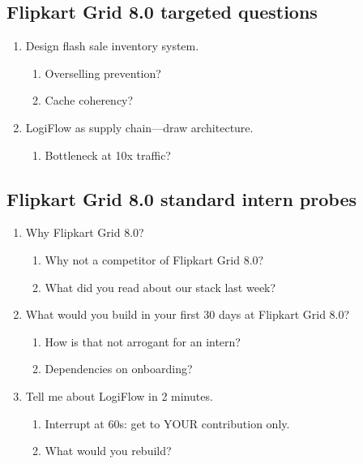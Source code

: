 \documentclass[9pt,a4paper]{article}
\begin{document}
\subsection{Flipkart Grid 8.0 targeted questions}
\begin{enumerate}[label=\textbf{Q\arabic*:}, leftmargin=*]
  \item Design flash sale inventory system.
  \begin{enumerate}[label=\textit{FU\arabic*:}, leftmargin=2em]
    \item Overselling prevention?
    \item Cache coherency?
  \end{enumerate}
  \item LogiFlow as supply chain---draw architecture.
  \begin{enumerate}[label=\textit{FU\arabic*:}, leftmargin=2em]
    \item Bottleneck at 10x traffic?
  \end{enumerate}
\end{enumerate}
\subsection{Flipkart Grid 8.0 standard intern probes}
\begin{enumerate}[label=\textbf{Q\arabic*:}, leftmargin=*]
  \item Why Flipkart Grid 8.0?
  \begin{enumerate}[label=\textit{FU\arabic*:}, leftmargin=2em]
    \item Why not a competitor of Flipkart Grid 8.0?
    \item What did you read about our stack last week?
  \end{enumerate}
  \item What would you build in your first 30 days at Flipkart Grid 8.0?
  \begin{enumerate}[label=\textit{FU\arabic*:}, leftmargin=2em]
    \item How is that not arrogant for an intern?
    \item Dependencies on onboarding?
  \end{enumerate}
  \item Tell me about LogiFlow in 2 minutes.
  \begin{enumerate}[label=\textit{FU\arabic*:}, leftmargin=2em]
    \item Interrupt at 60s: get to YOUR contribution only.
    \item What would you rebuild?
  \end{enumerate}
\end{enumerate}
\newpage
\end{document}
